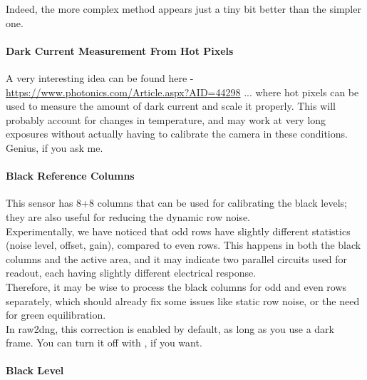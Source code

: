 Indeed, the more complex method appears just a tiny bit better than the simpler one.\\





\paragraph{Dark Current Measurement From Hot Pixels}

A very interesting idea can be found here - \href{https://www.photonics.com/Article.aspx?AID=44298}{https://www.photonics.com/Article.aspx?AID=44298} ... where hot pixels can be used to measure the amount of dark current and scale it properly. This will probably account for changes in temperature, and may work at very long exposures without actually having to calibrate the camera in these conditions. Genius, if you ask me. 





\paragraph{Black Reference Columns}

This sensor has 8+8 columns that can be used for calibrating the black levels; they are also useful for reducing the dynamic row noise.\\

Experimentally, we have noticed that odd rows have slightly different statistics (noise level, offset, gain), compared to even rows. This happens in both the black columns and the active area, and it may indicate two parallel circuits used for readout, each having slightly different electrical response.\\

Therefore, it may be wise to process the black columns for odd and even rows separately, which should already fix some issues like static row noise, or the need for green equilibration.\\

In raw2dng, this correction is enabled by default, as long as you use a dark frame. You can turn it off with , if you want. \\





\paragraph{Black Level}

